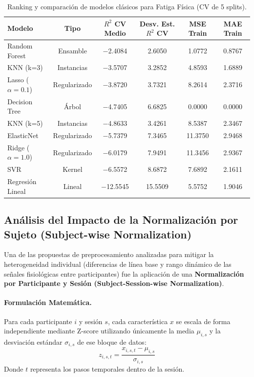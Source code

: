 \documentclass[12pt, a4paper]{article}
\begin{document}
\begin{table}[H]
\centering
\caption{Ranking y comparación de modelos clásicos para Fatiga Física (CV de 5 splits).}
\label{tab:ranking_clasicos}
\small
\begin{tabular}{@{}lccccc@{}}
\toprule
\textbf{Modelo} & \textbf{Tipo} & \textbf{$R^2$ CV Medio} & \textbf{Desv. Est. $R^2$ CV} & \textbf{MSE Train} & \textbf{MAE Train} \\
\midrule
Random Forest & Ensamble & $-$2.4084 & 2.6050 & 1.0772 & 0.8767 \\
KNN (k=3) & Instancias & $-$3.5707 & 3.2852 & 4.8593 & 1.6889 \\
Lasso ($\alpha=0.1$) & Regularizado & $-$3.8720 & 3.7321 & 8.2614 & 2.3716 \\
Decision Tree & Árbol & $-$4.7405 & 6.6825 & 0.0000 & 0.0000 \\
KNN (k=5) & Instancias & $-$4.8633 & 3.4261 & 8.5387 & 2.3467 \\
ElasticNet & Regularizado & $-$5.7379 & 7.3465 & 11.3750 & 2.9468 \\
Ridge ($\alpha=1.0$) & Regularizado & $-$6.0179 & 7.9491 & 11.3456 & 2.9367 \\
SVR & Kernel & $-$6.5572 & 8.6872 & 7.6892 & 2.1611 \\
Regresión Lineal & Lineal & $-$12.5545 & 15.5509 & 5.5752 & 1.9046 \\
\bottomrule
\end{tabular}
\end{table}

\subsection{Análisis del Impacto de la Normalización por Sujeto (Subject-wise Normalization)}
\label{subsec:normalizacion_sujeto}

Una de las propuestas de preprocesamiento analizadas para mitigar la heterogeneidad individual (diferencias de línea base y rango dinámico de las señales fisiológicas entre participantes) fue la aplicación de una \textbf{Normalización por Participante y Sesión (Subject-Session-wise Normalization)}.

\paragraph{Formulación Matemática.}
Para cada participante $i$ y sesión $s$, cada característica $x$ se escala de forma independiente mediante Z-score utilizando únicamente la media $\mu_{i,s}$ y la desviación estándar $\sigma_{i,s}$ de ese bloque de datos:
\[
z_{i,s,t} = \frac{x_{i,s,t} - \mu_{i,s}}{\sigma_{i,s}}
\]
Donde $t$ representa los pasos temporales dentro de la sesión.
\end{document}
